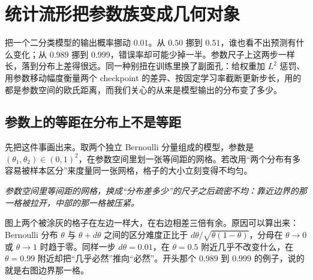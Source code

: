 \section{统计流形把参数族变成几何对象}
\label{sec:12-Real-Analysis-Support/09-Information-Geometry/01}

把一个二分类模型的输出概率挪动 \(0.01\)。从 \(0.50\) 挪到 \(0.51\)，谁也看不出预测有什么变化；从 \(0.989\) 挪到 \(0.999\)，错误率却可能少掉一半。参数尺子上这两步一样长，落到分布上差得很远。同一种别扭在训练里换了副面孔：给权重加 \(L^2\) 惩罚、用参数移动幅度衡量两个 checkpoint 的差异、按固定学习率截断更新步长，用的都是参数空间的欧氏距离，而我们关心的从来是模型输出的分布变了多少。

\subsection{参数上的等距在分布上不是等距}

先把这件事画出来。取两个独立 Bernoulli 分量组成的模型，参数是 \((\theta_1,\theta_2)\in(0,1)^2\)，在参数空间里划一张等间距的网格。若改用``两个分布有多容易被样本区分''来度量同一张网格，格子的大小立刻变得不均匀。

\begin{center}
\end{center}

\emph{参数空间里等间距的网格，换成``分布差多少''的尺子之后疏密不均：靠近边界的那一格被拉开，中部的那一格被压紧。}

图上两个被涂灰的格子在左边一样大，在右边相差三倍有余。原因可以算出来：Bernoulli 分布 \(\theta\) 与 \(\theta+d\theta\) 之间的区分难度正比于 \(d\theta/\sqrt{\theta(1-\theta)}\)，分母在 \(\theta\to0\) 或 \(\theta\to1\) 时趋于零。同样一步 \(d\theta=0.01\)，在 \(\theta=0.5\) 附近几乎不改变什么，在 \(\theta=0.99\) 附近却把``几乎必然''推向``必然''。开头那个 \(0.989\) 到 \(0.999\) 的例子，说的就是右图边界那一格。

